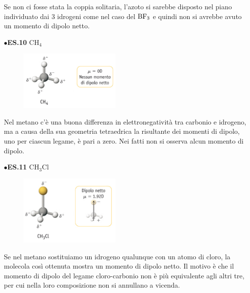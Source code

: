 Se non ci fosse stata la coppia solitaria, l'azoto si sarebbe disposto nel piano individuato dai 3 idrogeni come nel caso del $\rm BF_3$ e quindi non si avrebbe avuto un momento di dipolo netto.

\vspace{0.2cm}$\bullet$\textbf{ES.10} CH$_4$

\hspace{0.5cm}\begin{minipage}{0.2\textwidth}
\begin{figure}[H]
\includegraphics[width=5cm]{immagini/CH_4.png}
\end{figure}
\end{minipage} \hfill
\begin{minipage}{0.5\textwidth}
 Nel metano c'è una buona differenza in elettronegatività tra carbonio e idrogeno, ma a causa della sua geometria tetraedrica la risultante dei momenti di dipolo, uno per ciascun legame, è pari a zero. Nei fatti non si osserva alcun momento di dipolo.
\end{minipage}

\vspace{0.2cm}$\bullet$\textbf{ES.11} CH$_3$Cl

\hspace{0.5cm}\begin{minipage}{0.2\textwidth}
\begin{figure}[H]
\includegraphics[width=5cm]{immagini/CH_3Cl.png}
\end{figure}
\end{minipage} \hfill
\begin{minipage}{0.5\textwidth}
\vspace{0.4cm}Se nel metano sostituiamo un idrogeno qualunque con un atomo di cloro, la molecola così ottenuta mostra un momento di dipolo netto. Il motivo è che il momento di dipolo del legame cloro-carbonio non è più equivalente agli altri tre, per cui nella loro composizione non si annullano a vicenda.
\end{minipage}

